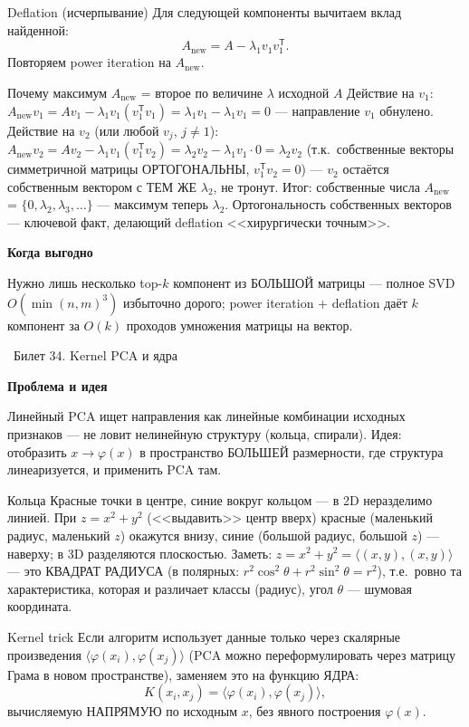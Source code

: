 \documentclass[12pt, a4paper]{article}
\newcommand{\bilet}[2]{%
  \vspace{10pt}%
  \noindent\colorbox{qcolor}{\parbox{\dimexpr\linewidth-2\fboxsep\relax}{%
    \color{white}\large\bfseries\strut\ Билет #1. #2%
  }}%
  \nopagebreak\vspace{5pt}\par\nopagebreak%
}
\newcommand{\qsub}[1]{%
  \vspace{5pt}%
  {\bfseries\color{defblue} #1}%
  \par\vspace{2pt}%
}
\newcommand{\tr}{^{\mathsf{T}}}
\begin{document}
\begin{defbox}{Deflation (исчерпывание)}
Для следующей компоненты вычитаем вклад найденной:
\[
  A_{\text{new}} = A - \lambda_1 v_1 v_1\tr.
\]
Повторяем power iteration на $A_{\text{new}}$.
\end{defbox}

\begin{proofbox}{Почему максимум $A_{\text{new}}$ = второе по величине $\lambda$ исходной $A$}
Действие на $v_1$: $A_{\text{new}}v_1 = Av_1 - \lambda_1 v_1(v_1\tr v_1) = \lambda_1 v_1 - \lambda_1 v_1 = 0$ --- направление $v_1$ обнулено.\\
Действие на $v_2$ (или любой $v_j$, $j\ne1$): $A_{\text{new}}v_2 = Av_2 - \lambda_1 v_1(v_1\tr v_2) = \lambda_2 v_2 - \lambda_1 v_1\cdot 0 = \lambda_2 v_2$ (т.к.\ собственные векторы симметричной матрицы ОРТОГОНАЛЬНЫ, $v_1\tr v_2=0$) --- $v_2$ остаётся собственным вектором с ТЕМ ЖЕ $\lambda_2$, не тронут. Итог: собственные числа $A_{\text{new}}$ = $\{0,\lambda_2,\lambda_3,\dots\}$ --- максимум теперь $\lambda_2$. Ортогональность собственных векторов --- ключевой факт, делающий deflation <<хирургически точным>>.
\end{proofbox}

\qsub{Когда выгодно}
Нужно лишь несколько top-$k$ компонент из БОЛЬШОЙ матрицы --- полное SVD $O(\min(n,m)^3)$ избыточно дорого; power iteration + deflation даёт $k$ компонент за $O(k)$ проходов умножения матрицы на вектор.

\bilet{34}{Kernel PCA и ядра}

\qsub{Проблема и идея}
Линейный PCA ищет направления как линейные комбинации исходных признаков --- не ловит нелинейную структуру (кольца, спирали). Идея: отобразить $x \to \varphi(x)$ в пространство БОЛЬШЕЙ размерности, где структура линеаризуется, и применить PCA там.

\begin{exbox}{Кольца}
Красные точки в центре, синие вокруг кольцом --- в 2D неразделимо линией. При $z = x^2+y^2$ (<<выдавить>> центр вверх) красные (маленький радиус, маленький $z$) окажутся внизу, синие (большой радиус, большой $z$) --- наверху; в 3D разделяются плоскостью. Заметь: $z = x^2+y^2 = \langle(x,y),(x,y)\rangle$ --- это КВАДРАТ РАДИУСА (в полярных: $r^2\cos^2\theta+r^2\sin^2\theta=r^2$), т.е.\ ровно та характеристика, которая и различает классы (радиус), угол $\theta$ --- шумовая координата.
\end{exbox}

\begin{defbox}{Kernel trick}
Если алгоритм использует данные только через скалярные произведения $\langle\varphi(x_i),\varphi(x_j)\rangle$ (PCA можно переформулировать через матрицу Грама в новом пространстве), заменяем это на функцию ЯДРА:
\[
  K(x_i,x_j) = \langle \varphi(x_i), \varphi(x_j)\rangle,
\]
вычисляемую НАПРЯМУЮ по исходным $x$, без явного построения $\varphi(x)$.
\end{defbox}
\end{document}
